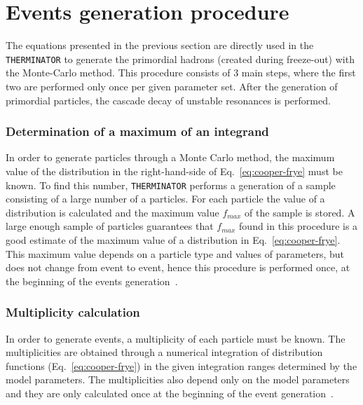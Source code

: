   \section{Events generation procedure}
    The equations presented in the previous section are directly used in the \verb|THERMINATOR| to generate the primordial hadrons (created during freeze-out) with the Monte-Carlo method.
    This procedure consists of 3 main steps, where the first two are performed only once per given parameter set.
    After the generation of primordial particles, the cascade decay of unstable resonances is performed.
    \subsubsection{Determination of a maximum of an integrand}
      In order to generate particles through a Monte Carlo method, the maximum value of the distribution in the right-hand-side of Eq.~\ref{eq:cooper-frye} must be known.
      To find this number, \verb|THERMINATOR| performs a generation of a sample consisting of a large number of a particles.
      For each particle the value of a distribution is calculated and the maximum value $f_{max}$ of the sample is stored.
      A large enough sample of particles guarantees that $f_{max}$ found in this procedure is a good estimate of the maximum value of a distribution in Eq.~\ref{eq:cooper-frye}.
      This maximum value depends on a particle type and values of parameters, but does not change from event to event, hence this procedure is performed once, at the beginning of the events generation~\cite{therminator}.
    \subsubsection{Multiplicity calculation}
      In order to generate events, a multiplicity of each particle must be known.
      The multiplicities are obtained through a numerical integration of distribution functions (Eq.~\ref{eq:cooper-frye}) in the given integration ranges determined by the model parameters.
      The multiplicities also depend only on the model parameters and they are only calculated once at the beginning of the event generation~\cite{therminator}.
